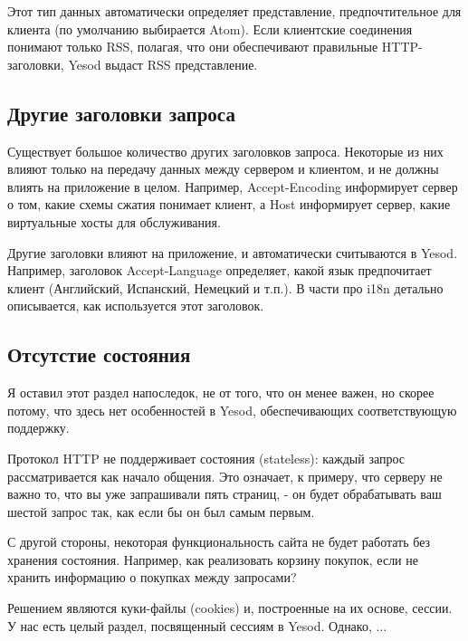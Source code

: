Этот тип данных автоматически определяет представление, предпочтительное для клиента (по умолчанию выбирается Atom). Если клиентские соединения понимают только RSS, полагая, что они обеспечивают правильные HTTP-заголовки, Yesod выдаст RSS представление.

\subsection{Другие заголовки запроса}

Существует большое количество других заголовков запроса. Некоторые из них влияют только на передачу данных между сервером и клиентом, и не должны влиять на приложение в целом. Например, Accept-Encoding информирует сервер о том, какие схемы сжатия понимает клиент, а Host информирует сервер, какие виртуальные хосты для обслуживания.

Другие заголовки влияют на приложение, и автоматически считываются в Yesod. Например, заголовок Accept-Language определяет, какой язык предпочитает клиент (Английский, Испанский, Немецкий и т.п.). В части про i18n детально описывается, как используется этот заголовок.

\subsection{Отсутстие состояния}

Я оставил этот раздел напоследок, не от того, что он менее важен, но скорее потому, что здесь нет особенностей в Yesod, обеспечивающих соответствующую поддержку.

Протокол HTTP не поддерживает состояния (stateless): каждый запрос рассматривается как начало общения. Это означает, к примеру, что серверу не важно то, что вы уже запрашивали пять страниц, - он будет обрабатывать ваш шестой запрос так, как если бы он был самым первым.

С другой стороны, некоторая функциональность сайта не будет работать без хранения состояния. Например, как реализовать корзину покупок, если не хранить информацию о покупках между запросами?

Решением являются куки-файлы (cookies) и, построенные на их основе, сессии. У нас есть целый раздел, посвященный сессиям в Yesod. Однако, ...


